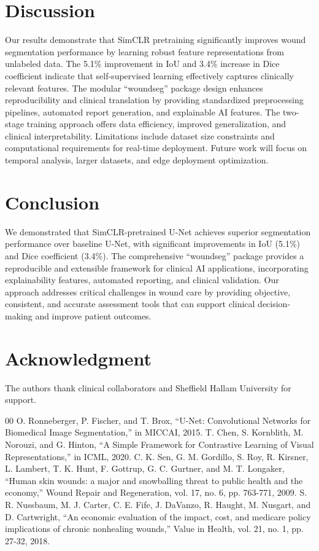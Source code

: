 \documentclass[conference]{IEEEtran}
\begin{document}
\section{Discussion}
Our results demonstrate that SimCLR pretraining significantly improves wound segmentation performance by learning robust feature representations from unlabeled data. The 5.1\% improvement in IoU and 3.4\% increase in Dice coefficient indicate that self-supervised learning effectively captures clinically relevant features. The modular ``woundseg'' package design enhances reproducibility and clinical translation by providing standardized preprocessing pipelines, automated report generation, and explainable AI features. The two-stage training approach offers data efficiency, improved generalization, and clinical interpretability. Limitations include dataset size constraints and computational requirements for real-time deployment. Future work will focus on temporal analysis, larger datasets, and edge deployment optimization.

\section{Conclusion}
We demonstrated that SimCLR-pretrained U-Net achieves superior segmentation performance over baseline U-Net, with significant improvements in IoU (5.1\%) and Dice coefficient (3.4\%). The comprehensive ``woundseg'' package provides a reproducible and extensible framework for clinical AI applications, incorporating explainability features, automated reporting, and clinical validation. Our approach addresses critical challenges in wound care by providing objective, consistent, and accurate assessment tools that can support clinical decision-making and improve patient outcomes.

\section*{Acknowledgment}
The authors thank clinical collaborators and Sheffield Hallam University for support.

\begin{thebibliography}{00}
 O. Ronneberger, P. Fischer, and T. Brox, ``U-Net: Convolutional Networks for Biomedical Image Segmentation,'' in MICCAI, 2015.
 T. Chen, S. Kornblith, M. Norouzi, and G. Hinton, ``A Simple Framework for Contrastive Learning of Visual Representations,'' in ICML, 2020.
 C. K. Sen, G. M. Gordillo, S. Roy, R. Kirsner, L. Lambert, T. K. Hunt, F. Gottrup, G. C. Gurtner, and M. T. Longaker, ``Human skin wounds: a major and snowballing threat to public health and the economy,'' Wound Repair and Regeneration, vol. 17, no. 6, pp. 763-771, 2009.
 S. R. Nussbaum, M. J. Carter, C. E. Fife, J. DaVanzo, R. Haught, M. Nusgart, and D. Cartwright, ``An economic evaluation of the impact, cost, and medicare policy implications of chronic nonhealing wounds,'' Value in Health, vol. 21, no. 1, pp. 27-32, 2018.
\end{thebibliography}
\end{document}

